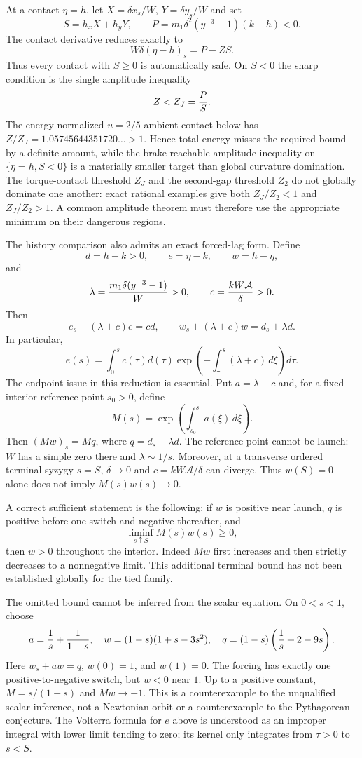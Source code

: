 \documentclass[11pt]{article}
\begin{document}
At a contact $\eta=h$, let
$X=\delta x_s/W$, $Y=\delta y_s/W$ and set
\[
 S=h_xX+h_yY,\qquad
 P=m_1\delta^2(y^{-3}-1)(k-h)<0.
\]
The contact derivative reduces exactly to
\[
 W\delta(\eta-h)_s=P-ZS.
\]
Thus every contact with $S\ge0$ is automatically safe.  On $S<0$ the sharp
condition is the single amplitude inequality
\[
 Z<Z_J={P\over S}.
\]
The energy-normalized $u=2/5$ ambient contact below has
$Z/Z_J=1.05745644351720\ldots>1$.  Hence total energy misses the required
bound by a definite amount, while the brake-reachable amplitude inequality
on $\{\eta=h,S<0\}$ is a materially smaller target than global curvature
domination.
The torque-contact threshold $Z_J$ and the second-gap threshold $Z_2$ do not
globally dominate one another: exact rational examples give both
$Z_J/Z_2<1$ and $Z_J/Z_2>1$.  A common amplitude theorem must therefore use
the appropriate minimum on their dangerous regions.

The history comparison also admits an exact forced-lag form.  Define
\[
 d=h-k>0,\qquad e=\eta-k,\qquad w=h-\eta,
\]
and
\[
 \lambda={m_1\delta(y^{-3}-1)\over W}>0,
 \qquad c={kW\mathcal A\over\delta}>0.
\]
Then
\[
 e_s+(\lambda+c)e=cd,\qquad
 w_s+(\lambda+c)w=d_s+\lambda d.
\]
In particular,
\[
 e(s)=\int_0^s c(\tau)d(\tau)
 \exp\!\left(-\int_\tau^s(\lambda+c)\,d\xi\right)d\tau.
\]
The endpoint issue in this reduction is essential. Put
$a=\lambda+c$ and, for a fixed interior reference point $s_0>0$, define
\[
 M(s)=\exp\!\left(\int_{s_0}^s a(\xi)\,d\xi\right).
\]
Then $(Mw)_s=Mq$, where $q=d_s+\lambda d$. The reference point cannot be
launch: $W$ has a simple zero there and $\lambda\sim1/s$. Moreover,
at a transverse ordered terminal syzygy $s=S$, $\delta\to0$ and
$c=kW\mathcal A/\delta$ can diverge. Thus $w(S)=0$ alone does not imply
$M(s)w(s)\to0$.

A correct sufficient statement is the following: if $w$ is positive near
launch, $q$ is positive before one switch and negative thereafter, and
\[
 \liminf_{s\uparrow S}M(s)w(s)\ge0,
\]
then $w>0$ throughout the interior. Indeed $Mw$ first increases and then
strictly decreases to a nonnegative limit. This additional terminal bound
has not been established globally for the tied family.

The omitted bound cannot be inferred from the scalar equation. On $0<s<1$,
choose
\[
 a={1\over s}+{1\over1-s},\quad
 w=(1-s)(1+s-3s^2),\quad
 q=(1-s)\left({1\over s}+2-9s\right).
\]
Here $w_s+aw=q$, $w(0)=1$, and $w(1)=0$. The forcing has exactly one
positive-to-negative switch, but $w<0$ near $1$. Up to a positive constant,
$M=s/(1-s)$ and $Mw\to-1$. This is a counterexample to the unqualified
scalar inference, not a Newtonian orbit or a counterexample to the
Pythagorean conjecture. The Volterra formula for $e$ above is understood
as an improper integral with lower limit tending to zero; its kernel only
integrates from $\tau>0$ to $s<S$.
\end{document}
